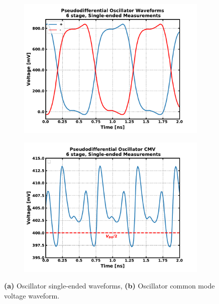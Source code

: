 			\begin{figure}[htb!]
			    \centering
			    \begin{subfigure}{0.5\textwidth}
			        \centering
			        \includegraphics[width=1\textwidth, angle=0]{./figs/results/osc_se_waves}
			        \caption{ }
			        \label{fig:osc_se_waves}
			    \end{subfigure}%
			    \begin{subfigure}{0.5\textwidth}
			        \centering
			        \includegraphics[width=1\textwidth, angle=0]{./figs/results/osc_cmv}
			        \caption{ }
			        \label{fig:osc_cmv}
			    \end{subfigure}
			    \caption{\textbf{(a)} Oscillator single-ended waveforms, \textbf{(b)} Oscillator common mode voltage waveform.}
			    \label{fig:osc_waves}
			\end{figure} 



